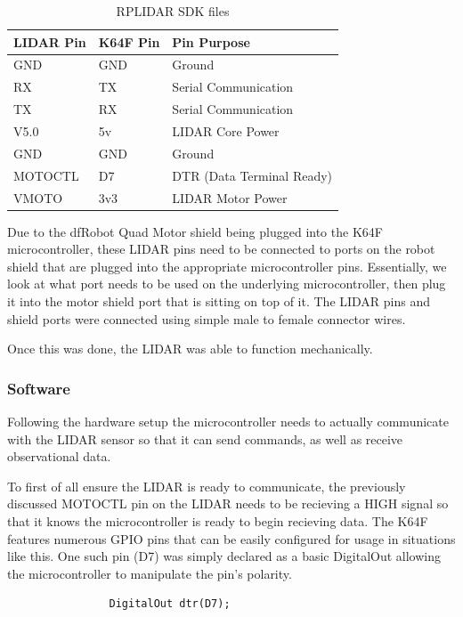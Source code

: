 				\begin{table}[h!]
					\centering
					\begin{tabular}{|| l | l | l ||} 
						\hline
						LIDAR Pin & K64F Pin & Pin Purpose \\ [0.5ex] 
						\hline
						GND  & GND & Ground  \\ 
						RX  & TX  & Serial Communication \\
						TX  & RX & Serial Communication \\
						V5.0 & 5v & LIDAR Core Power \\ 
						GND & GND & Ground \\ 
						MOTOCTL & D7 & DTR (Data Terminal Ready) \\ 
						VMOTO & 3v3 & LIDAR Motor Power \\ [1ex] 
						\hline
					\end{tabular}
					\caption{RPLIDAR SDK files}
					\label{table:3}
				\end{table}
			
				Due to the dfRobot Quad Motor shield being plugged into the K64F microcontroller, these LIDAR pins need to be connected to ports on the robot shield that are plugged into the appropriate microcontroller pins. Essentially, we look at what port needs to be used on the underlying microcontroller, then plug it into the motor shield port that is sitting on top of it. The LIDAR pins and shield ports were connected using simple male to female connector wires.
				
				Once this was done, the LIDAR was able to function mechanically.
				
				\subsubsection{Software}
				Following the hardware setup the microcontroller needs to actually communicate with the LIDAR sensor so that it can send commands, as well as receive observational data. 
				
				To first of all ensure the LIDAR is ready to communicate, the previously discussed MOTOCTL pin on the LIDAR needs to be recieving a HIGH signal so that it knows the microcontroller is ready to begin recieving data. The K64F features numerous GPIO pins that can be easily configured for usage in situations like this. One such pin (D7) was simply declared as a basic DigitalOut allowing the microcontroller to manipulate the pin's polarity.
				
				\begin{lstlisting}
				DigitalOut dtr(D7);
				\end{lstlisting}
				
